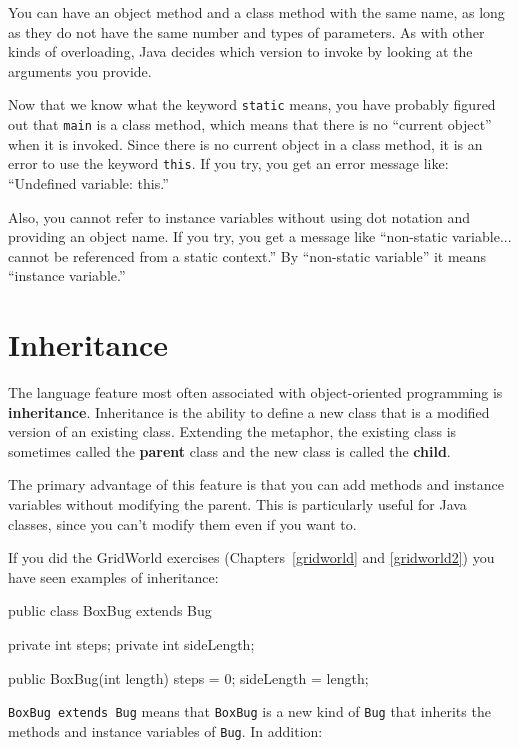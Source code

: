 You can have an object method and a class method with the same
name, as long as they do not have the same number and types of
parameters.  As with other kinds of overloading, Java decides
which version to invoke by looking at the arguments you provide.

Now that we know what the keyword {\tt static} means, you
have probably figured out that {\tt main} is a class method,
which means that there is no ``current object'' when it is invoked.
%
Since there is no current object in a class method, it is an
error to use the keyword {\tt this}.  If you try, you get
an error message like: ``Undefined variable: this.''

Also, you cannot refer to instance variables without using dot
notation and providing an object name.  If you try, you get a message
like ``non-static variable... cannot be referenced from a static
context.''  By ``non-static variable'' it means ``instance variable.''


\section{Inheritance}

The language feature most often associated with
object-oriented programming is {\bf inheritance}.  Inheritance is the
ability to define a new class that is a modified version of an
existing class.
%
Extending the metaphor, the existing
class is sometimes called the {\bf parent} class and the new
class is called the {\bf child}.

The primary advantage of this feature is that you can add methods
and instance variables without modifying the
parent.  This is particularly useful for Java classes,
since you can't modify them even if you want to.

If you did the GridWorld exercises (Chapters~\ref{gridworld} and
\ref{gridworld2}) you have seen examples of inheritance:

\begin{code}
public class BoxBug extends Bug {
    private int steps;
    private int sideLength;

    public BoxBug(int length) {
        steps = 0;
        sideLength = length;
    }
}
\end{code}

{\tt BoxBug extends Bug} means that {\tt BoxBug} is a new
kind of {\tt Bug} that inherits the methods and instance
variables of {\tt Bug}.  In addition:


